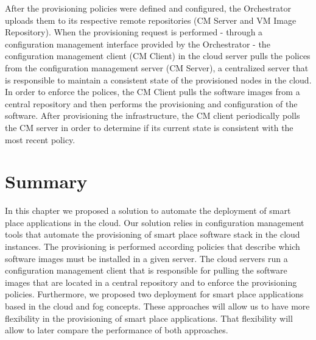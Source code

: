 After the provisioning policies were defined and configured, the Orchestrator uploads them to its respective
remote repositories (CM Server and VM Image Repository). When the provisioning request is performed -
through a configuration management interface provided by the Orchestrator - the configuration management
client (\gls{CM} Client) in the cloud server pulls the polices from the configuration management server
(\gls{CM} Server), a centralized server that is responsible to maintain a consistent state of the
provisioned nodes in the cloud. In order to enforce the polices, the \gls{CM} Client pulls the software
images from a central repository and then performs the provisioning and configuration of the software.
After provisioning the infrastructure, the CM client periodically polls the CM server in order to
determine if its current state is consistent with the most recent policy.

\section{Summary}
\label{sec:sol_summary}
In this chapter we proposed a solution to automate the deployment of smart place applications in the
cloud. Our solution relies in configuration management tools that automate the provisioning of
smart place software stack in the cloud instances. The provisioning is performed according policies
that describe which software images must be installed in a given server. The cloud servers run a
configuration management client that is responsible for pulling the software images that are located
in a central repository and to enforce the provisioning policies. Furthermore, we proposed two deployment
for smart place applications based in the cloud and fog concepts. These approaches will allow us to
have more flexibility in the provisioning of smart place applications. That flexibility will allow to
later compare the performance of both approaches.
